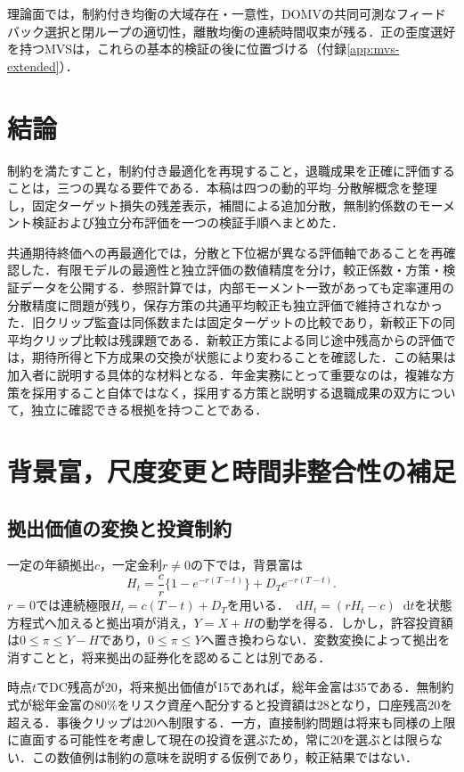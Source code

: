 \documentclass[11pt,a4paper]{article}
\numberwithin{equation}{section}
\numberwithin{table}{section}
\numberwithin{figure}{section}
\theoremstyle{plain}
\theoremstyle{definition}
\newcommand{\dd}{\mathop{}\!\mathrm{d}}
\begin{document}
理論面では，制約付き均衡の大域存在・一意性，DOMVの共同可測なフィードバック選択と閉ループの適切性，離散均衡の連続時間収束が残る．正の歪度選好を持つMVSは，これらの基本的検証の後に位置づける（付録\ref{app:mvs-extended}）．

\FloatBarrier
\section{結論}
制約を満たすこと，制約付き最適化を再現すること，退職成果を正確に評価することは，三つの異なる要件である．本稿は四つの動的平均--分散解概念を整理し，固定ターゲット損失の残差表示，補間による追加分散，無制約係数のモーメント検証および独立分布評価を一つの検証手順へまとめた．

共通期待終価への再最適化では，分散と下位裾が異なる評価軸であることを再確認した．有限モデルの最適性と独立評価の数値精度を分け，較正係数・方策・検証データを公開する．参照計算では，内部モーメント一致があっても定率運用の分散精度に問題が残り，保存方策の共通平均較正も独立評価で維持されなかった．旧クリップ監査は同係数または固定ターゲットの比較であり，新較正下の同平均クリップ比較は残課題である．新較正方策による同じ途中残高からの評価では，期待所得と下方成果の交換が状態により変わることを確認した．この結果は加入者に説明する具体的な材料となる．年金実務にとって重要なのは，複雑な方策を採用すること自体ではなく，採用する方策と説明する退職成果の双方について，独立に確認できる根拠を持つことである．


\clearpage\appendix
\FloatBarrier
\section{背景富，尺度変更と時間非整合性の補足}
\label{app:background}
\subsection{拠出価値の変換と投資制約}
一定の年額拠出$c$，一定金利$r\ne0$の下では，背景富は
\begin{equation}
H_t=\frac{c}{r}\{1-e^{-r(T-t)}\}+D_Te^{-r(T-t)}.
\end{equation}
$r=0$では連続極限$H_t=c(T-t)+D_T$を用いる．$\dd H_t=(rH_t-c)\dd t$を状態方程式へ加えると拠出項が消え，$Y=X+H$の動学を得る．しかし，許容投資額は$0\leq\pi\leq Y-H$であり，$0\leq\pi\leq Y$へ置き換わらない．変数変換によって拠出を消すことと，将来拠出の証券化を認めることは別である．

時点$t$でDC残高が20，将来拠出価値が15であれば，総年金富は35である．無制約式が総年金富の80\%をリスク資産へ配分すると投資額は28となり，口座残高20を超える．事後クリップは20へ制限する．一方，直接制約問題は将来も同様の上限に直面する可能性を考慮して現在の投資を選ぶため，常に20を選ぶとは限らない．この数値例は制約の意味を説明する仮例であり，較正結果ではない．
\end{document}
